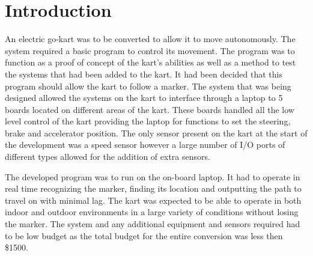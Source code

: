 \section{Introduction}

An electric go-kart was to be converted to allow it to move autonomously. The system required a basic program to control its movement. The program was to function as a proof of concept of the kart’s abilities as well as a method to test the systems that had been added to the kart. It had been decided that this program should allow the kart to follow a marker. The system that was being designed allowed the systems on the kart to interface through a laptop to 5 boards located on different areas of the kart. These boards handled all the low level control of the kart providing the laptop for functions to set the steering, brake and accelerator position. The only sensor present on the kart at the start of the development was a speed sensor however a large number of I/O ports of different types allowed for the addition of extra sensors.  

The developed program was to run on the on-board laptop. It had to operate in real time recognizing the marker, finding its location and outputting the path to travel on with minimal lag. The kart was expected to be able to operate in both indoor and outdoor environments in a large variety of conditions without losing the marker. The system and any additional equipment and sensors required had to be low budget as the total budget for the entire conversion was less then \$1500.